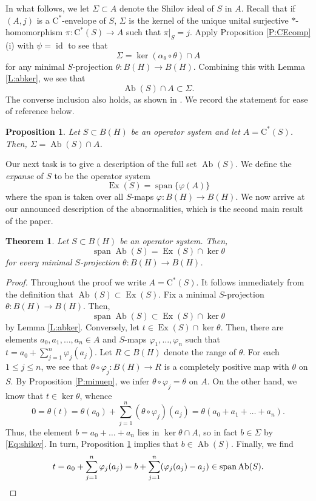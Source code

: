 \documentclass[10pt]{amsart}
\newcommand{\rC}{\mathrm{C}}
\renewcommand{\phi}{\varphi}
\newcommand{\Ab}{\operatorname{Ab}}
\newcommand{\Exp}{\operatorname{Ex}}
\newcommand{\id}{\operatorname{id}}
\newcommand{\spn}{\operatorname{span}}
\newtheorem{theorem}[lemma]{Theorem}
\newtheorem{proposition}[lemma]{Proposition}
\theoremstyle{definition}
\begin{document}
In what follows, we let $\Sigma\subset A$ denote the Shilov ideal of $S$ in $A$. Recall that if $(A,j)$ is a $\rC^*$-envelope of $S$,  $\Sigma$ is the kernel of the unique unital surjective $*$-homomorphism $\pi:\rC^*(S)\to A$ such that $\pi|_S=j$. Apply  Proposition \ref{P:CEcomp}(i) with $\psi=\id$ to see that 
\begin{equation}\label{Eq:shilov}
\Sigma=\ker (\alpha_\theta\circ \theta)\cap A
\end{equation}
for any minimal $S$-projection $\theta:B(H)\to B(H)$. Combining this with Lemma \ref{L:abker}, we see that 
\begin{equation}\label{Eq:Abincl}
\Ab(S)\cap A \subset \Sigma.
\end{equation}
 The converse inclusion also holds, as shown in \cite[Proposition 3.4]{kakariadis2013}. We record the statement for ease of reference below.

\begin{proposition}\label{P:abShi}
Let $S\subset B(H)$ be an operator system and let $A=\rC^*(S)$. Then, $\Sigma=\Ab(S)\cap A$.
\end{proposition}

Our next task is to give a description of the full set $\Ab(S)$.  We define the \emph{expanse} of $S$ to be the operator system 
\[
\Exp(S)=\spn\{\phi(A) \}
\] 
where the span is taken over all $S$-maps $\phi:B(H)\to B(H)$.  We now arrive at our announced description of the abnormalities, which is the second main result of the paper.

\begin{theorem}\label{T:abdescr}
Let $S\subset B(H)$ be an operator system. Then, \[\spn \Ab(S)=\Exp(S)\cap \ker \theta\] for every minimal $S$-projection $\theta:B(H)\to B(H)$.
\end{theorem}
\begin{proof}
Throughout the proof we write $A=\rC^*(S)$. It follows immediately from the definition that $\Ab(S)\subset \Exp(S)$. Fix a minimal $S$-projection $\theta:B(H)\to B(H)$.
Then,  \[\spn \Ab(S)\subset \Exp(S)\cap \ker \theta\]  by Lemma \ref{L:abker}. Conversely, let $t\in \Exp(S)\cap \ker \theta$. Then, there are elements $a_0,a_1,\ldots,a_n\in A$ and $S$-maps $\phi_1,\ldots,\phi_n$ such that $t=a_0+\sum_{j=1}^n \phi_j(a_j)$. Let $R\subset B(H)$ denote the range of $\theta$. For each $1\leq j\leq n$, we see that $\theta\circ \phi_j:B(H)\to R$ is a completely positive map with $\theta$ on $S$. By Proposition \ref{P:minuep}, we infer $\theta\circ \phi_j=\theta$ on $A$. On the other hand, we know that $t\in \ker \theta$, whence
\[
0=\theta(t)=\theta(a_0)+\sum_{j=1}^n (\theta\circ \phi_j)(a_j)=\theta( a_0+a_1+\ldots+a_n).
\]
Thus, the element $b=a_0+\ldots+a_n$ lies in $\ker \theta\cap A$, so in fact $b\in \Sigma$ by \eqref{Eq:shilov}. In turn, Proposition \ref{P:abShi} implies that  $b\in \Ab(S)$. Finally, we find
\[
t=a_0+\sum_{j=1}^n \phi_j(a_j) =b+\sum_{j=1}^n (\phi_j(a_j)-a_j)\in \spn \Ab(S).\qedhere
\]
\end{proof}
\end{document}
